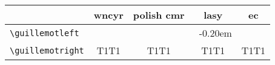 \documentclass[a4paper,11pt]{article}
\newcommand\CyrGuillemot{%
  \def\selectguillfont{\fontencoding{OT2}\fontfamily{wncyr}\selectfont}
  \def\guillemotleft{\selectguillfont\symbol{60}}
  \def\guillemotright{\selectguillfont\symbol{62}}
}
\newcommand\PlGuillemot{%
  \def\selectguillfont{\fontencoding{OT4}\fontfamily{cmr}\selectfont}
  \def\guillemotleft{\selectguillfont\symbol{174}}
  \def\guillemotright{\selectguillfont\symbol{175}}
}
\newcommand\LaGuillemot{%
  \def\selectguillfont{\fontencoding{U}\fontfamily{lasy}%
    \fontseries{m}\fontshape{n}\selectfont}
  \def\guillemotleft{\selectguillfont\hbox{\symbol{40}%
    \kern-0.20em\symbol{40}}}
  \def\guillemotright{\selectguillfont\hbox{\symbol{41}%
    \kern-0.20em\symbol{41}}}
}
\newcommand\ECGuillemot{%
  \def\selectguillfont{\fontencoding{T1}\fontfamily{cmr}\selectfont}
  \def\guillemotleft{\selectguillfont\symbol{19}}
  \def\guillemotright{\selectguillfont\symbol{20}}
}
\newcommand\CyrGLeft{\CyrGuillemot\guillemotleft}
\newcommand\CyrGRight{\CyrGuillemot\guillemotright}
\newcommand\PlGLeft{\PlGuillemot\guillemotleft}
\newcommand\PlGRight{\PlGuillemot\guillemotright}
\newcommand\LaGLeft{\LaGuillemot\guillemotleft}
\newcommand\LaGRight{\LaGuillemot\guillemotright}
\newcommand\ECGLeft{\ECGuillemot\guillemotleft}
\newcommand\ECGRight{\ECGuillemot\guillemotright}
\begin{document}
\begin{tabular}{l|cccc}
                            & \textbf{wncyr}  & \textbf{polish cmr} 
			    & \textbf{lasy}   & \textbf{ec} \\ \hline
    \verb|\guillemotleft|   & \CyrGLeft       & \PlGLeft 
                            & \LaGLeft        & \ECGLeft  \\
    \verb|\guillemotright|  & \CyrGRight      & \PlGRight
                            & \LaGRight       & \ECGRight
\end{tabular}
  
\end{document}
